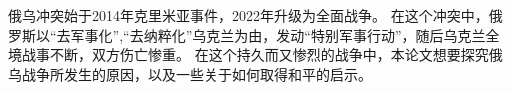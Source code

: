 俄乌冲突始于2014年克里米亚事件，2022年升级为全面战争。
在这个冲突中，俄罗斯以“去军事化”,“去纳粹化”乌克兰为由，发动“特别军事行动”，随后乌克兰全境战事不断，双方伤亡惨重。
在这个持久而又惨烈的战争中，本论文想要探究俄乌战争所发生的原因，以及一些关于如何取得和平的启示。